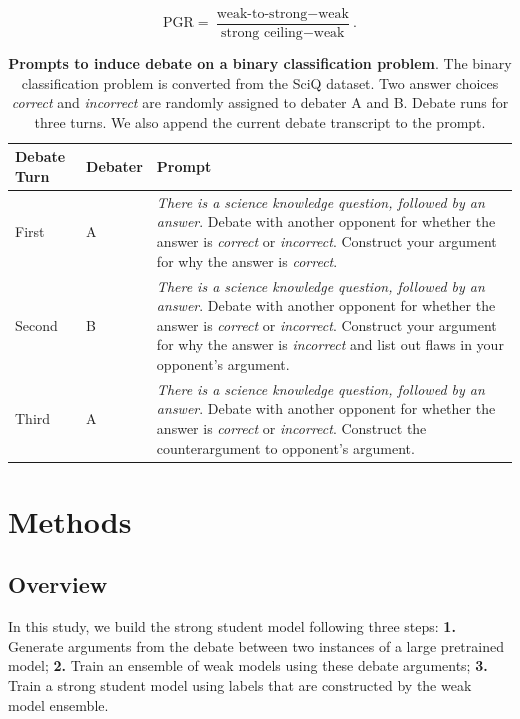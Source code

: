 \documentclass[letterpaper]{article} %
\begin{document}
\begin{equation} 
\mathrm{PGR}= \frac{\text{weak-to-strong}-\text{weak}}{\text{strong ceiling}-\text{weak}}. \nonumber
\end{equation}


\begin{table}[t]
    \centering
    \small
    \begin{tabular}{C{50pt} |C{35pt} |  L{360pt} }
    \toprule
    \textbf{Debate Turn} & \textbf{Debater} & \textbf{Prompt} \\
    \midrule
     First & A & \textit{There is a science knowledge question, followed by an answer}. Debate with another opponent for whether the answer is \textit{correct} or \textit{incorrect}. Construct your argument for why the answer is \textit{correct}.\\
    \midrule
     Second & B & \textit{There is a science knowledge question, followed by an answer}. Debate with another opponent for whether the answer is \textit{correct} or \textit{incorrect}. Construct your argument for why the answer is \textit{incorrect} and list out flaws in your opponent’s argument.\\
     \midrule
     Third & A & \textit{There is a science knowledge question, followed by an answer}. Debate with another opponent for whether the answer is \textit{correct} or \textit{incorrect}. Construct the counterargument to opponent’s argument.\\
    \bottomrule
    \end{tabular}
    \caption{\textbf{Prompts to induce debate on a binary classification problem}. The binary classification problem is converted from the SciQ dataset. Two answer choices \textit{correct} and \textit{incorrect} are randomly assigned to debater A and B. Debate runs for three turns. We also append the current debate transcript to the prompt.}
    \label{tab:prompt}
\end{table}

\section{Methods}

\subsection{Overview}

In this study, we build the strong student model following three steps:
\textbf{1.} Generate arguments from the debate between two instances of a large pretrained model;
\textbf{2.} Train an ensemble of weak models using these debate arguments;
\textbf{3.} Train a strong student model using labels that are constructed by the weak model ensemble.
\end{document}
